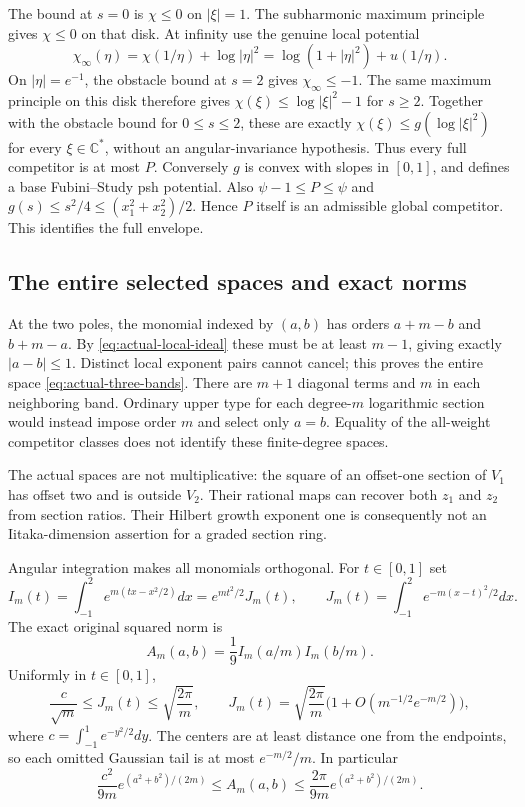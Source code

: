 \documentclass[11pt]{article}
\newcommand{\C}{\mathbb C}
\begin{document}
The bound at $s=0$ is $\chi\leq0$ on $|\xi|=1$.
The subharmonic maximum principle gives $\chi\leq0$ on that disk.
At infinity use the genuine local potential
\[
 \chi_\infty(\eta)=\chi(1/\eta)+\log|\eta|^2
                  =\log(1+|\eta|^2)+u(1/\eta).
\]
On $|\eta|=e^{-1}$, the obstacle bound at $s=2$ gives
$\chi_\infty\leq-1$. The same maximum principle on this disk
therefore gives $\chi(\xi)\leq\log|\xi|^2-1$ for $s\geq2$.
Together with the obstacle bound for $0\leq s\leq2$, these are
exactly $\chi(\xi)\leq g(\log|\xi|^2)$ for every $\xi\in\C^*$,
without an angular-invariance hypothesis.
Thus every full competitor is at most $P$. Conversely $g$ is
convex with slopes in $[0,1]$, and defines a base Fubini--Study
psh potential. Also $\psi-1\leq P\leq\psi$ and
$g(s)\leq s^2/4\leq(x_1^2+x_2^2)/2$. Hence $P$ itself is
an admissible global competitor. This identifies the full envelope.

\subsection{The entire selected spaces and exact norms}
At the two poles, the monomial indexed by $(a,b)$ has orders
$a+m-b$ and $b+m-a$. By \eqref{eq:actual-local-ideal} these
must be at least $m-1$, giving exactly $|a-b|\leq1$.
Distinct local exponent pairs cannot cancel; this proves the
entire space \eqref{eq:actual-three-bands}. There are $m+1$
diagonal terms and $m$ in each neighboring band. Ordinary upper
type for each degree-$m$ logarithmic section would instead impose
order $m$ and select only $a=b$. Equality of the all-weight
competitor classes does not identify these finite-degree spaces.

The actual spaces are not multiplicative: the square of an
offset-one section of $V_1$ has offset two and is outside $V_2$.
Their rational maps can recover both $z_1$ and $z_2$ from section
ratios. Their Hilbert growth exponent one is consequently not an
Iitaka-dimension assertion for a graded section ring.

Angular integration makes all monomials orthogonal. For $t\in[0,1]$
set
\[
 I_m(t)=\int_{-1}^2e^{m(tx-x^2/2)}dx
       =e^{mt^2/2}J_m(t),\qquad
 J_m(t)=\int_{-1}^2e^{-m(x-t)^2/2}dx.
\]
The exact original squared norm is
\[
 A_m(a,b)=\frac19 I_m(a/m)I_m(b/m).
\]
Uniformly in $t\in[0,1]$,
\[
 \frac c{\sqrt m}\leq J_m(t)\leq\sqrt{\frac{2\pi}m},\qquad
 J_m(t)=\sqrt{\frac{2\pi}m}
             \bigl(1+O(m^{-1/2}e^{-m/2})\bigr),
\]
where $c=\int_{-1}^1e^{-y^2/2}dy$. The centers are at least
distance one from the endpoints, so each omitted Gaussian tail
is at most $e^{-m/2}/m$. In particular
\begin{equation}\label{eq:actual-norms}
 \frac{c^2}{9m}e^{(a^2+b^2)/(2m)}\leq A_m(a,b)
             \leq\frac{2\pi}{9m}e^{(a^2+b^2)/(2m)}.
\end{equation}
\end{document}
